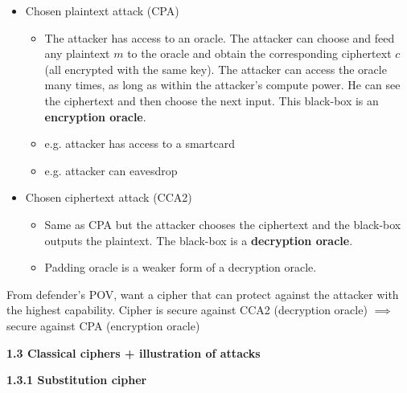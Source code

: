 \documentclass[landscape,a4paper]{extarticle}
\begin{document}
\begin{multicols*}{5}
\begin{itemize}
\begin{itemize}
\begin{itemize}
            \end{itemize}
            \item Chosen plaintext attack (CPA)
            \begin{itemize}
                \item The attacker has access to an oracle. The attacker can choose and feed any plaintext
                $m$ to the oracle and obtain the corresponding ciphertext $c$ (all encrypted with
                the same key). The attacker can access the oracle many times, as long as within the attacker's
                compute power. He can see the ciphertext and then choose the next input. This black-box is an
                \textbf{encryption oracle}. 
                \item e.g. attacker has access to a smartcard
                \item e.g. attacker can eavesdrop
            \end{itemize}
            \item Chosen ciphertext attack (CCA2)
            \begin{itemize}
                \item Same as CPA but the attacker chooses the ciphertext and the black-box
                outputs the plaintext. The black-box is a \textbf{decryption oracle}.
                \item Padding oracle is a weaker form of a decryption oracle.
            \end{itemize}
        \end{itemize}
    \end{itemize}

    From defender's POV, want a cipher that can protect against the attacker with the highest
    capability. Cipher is secure against CCA2 (decryption oracle) $\implies$ secure
    against CPA (encryption oracle)

    \textbf{1.3 Classical ciphers + illustration of attacks}

    \textbf{1.3.1 Substitution cipher}


\end{multicols*}
\end{document}
